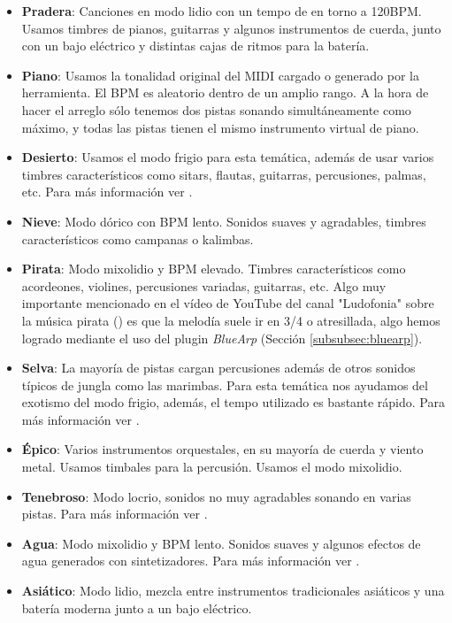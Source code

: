 \begin{itemize}
    \item \textbf{Pradera}: Canciones en modo lidio con un tempo de en torno a 120BPM. Usamos timbres de pianos, guitarras y algunos instrumentos de cuerda, junto con un bajo eléctrico y distintas cajas de ritmos para la batería.
    \item \textbf{Piano}: Usamos la tonalidad original del MIDI cargado o generado por la herramienta. El BPM es aleatorio dentro de un amplio rango. A la hora de hacer el arreglo sólo tenemos dos pistas sonando simultáneamente como máximo, y todas las pistas tienen el mismo instrumento virtual de piano.
    \item \textbf{Desierto}: Usamos el modo frigio para esta temática, además de usar varios timbres característicos como sitars, flautas, guitarras, percusiones, palmas, etc. Para más información ver \cite{LudofoniaDesierto}.
    \item \textbf{Nieve}: Modo dórico con BPM lento. Sonidos suaves y agradables, timbres característicos como campanas o kalimbas.
    \item \textbf{Pirata}: Modo mixolidio y BPM elevado. Timbres característicos como acordeones, violines, percusiones variadas, guitarras, etc. Algo muy importante mencionado en el vídeo de YouTube del canal "Ludofonia" sobre la música pirata (\cite{LudofoniaPiratas}) es que la melodía suele ir en 3/4 o atresillada, algo hemos logrado mediante el uso del plugin \textit{BlueArp} (Sección \ref{subsubsec:bluearp}). 
    \item \textbf{Selva}: La mayoría de pistas cargan percusiones además de otros sonidos típicos de jungla como las marimbas. Para esta temática nos ayudamos del exotismo del modo frigio, además, el tempo utilizado es bastante rápido. Para más información ver \cite{LudofoniaJungla}.
    \item \textbf{Épico}: Varios instrumentos orquestales, en su mayoría de cuerda y viento metal. Usamos timbales para la percusión. Usamos el modo mixolidio.
    \item \textbf{Tenebroso}: Modo locrio, sonidos no muy agradables sonando en varias pistas. Para más información ver \cite{LudofoniaTetrico}.
    \item \textbf{Agua}: Modo mixolidio y BPM lento. Sonidos suaves y algunos efectos de agua generados con sintetizadores. Para más información ver \cite{LudofoniaAgua}.
    \item \textbf{Asiático}: Modo lidio, mezcla entre  instrumentos tradicionales asiáticos y una batería moderna junto a un bajo eléctrico.

\end{itemize}
